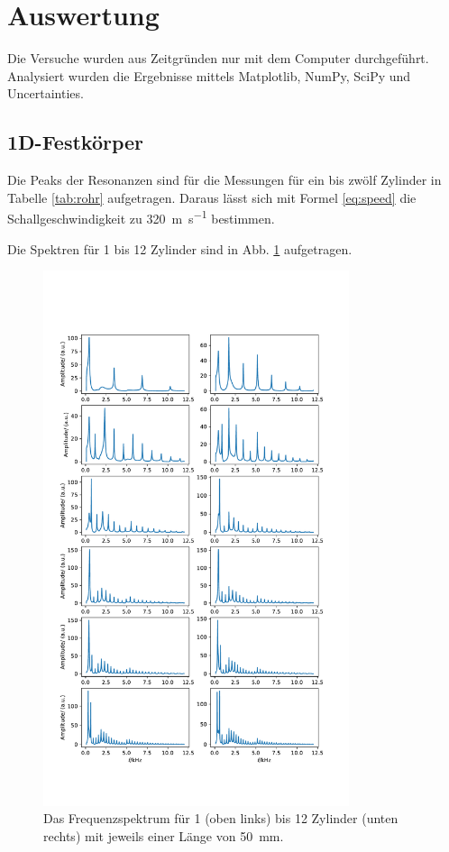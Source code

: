 \section{Auswertung}
\label{sec:Auswertung}

Die Versuche wurden aus Zeitgründen nur mit dem Computer durchgeführt. Analysiert wurden die Ergebnisse mittels Matplotlib, NumPy, SciPy und Uncertainties.

\subsection{1D-Festkörper}

Die Peaks der Resonanzen sind für die Messungen für ein bis zwölf Zylinder in Tabelle \ref{tab:rohr} aufgetragen. 
Daraus lässt sich mit Formel \ref{eq:speed} die Schallgeschwindigkeit zu \SI{320}{\meter\per\second} bestimmen. 

Die Spektren für \num{1} bis \num{12} Zylinder sind in Abb. \ref{fig:spec12} aufgetragen.

\begin{figure}
    \centering
    \includegraphics[width=0.8\textwidth]{plots/A_2.pdf}
    \caption{Das Frequenzspektrum für \num{1} (oben links) bis \num{12} Zylinder (unten rechts) mit jeweils einer Länge von \SI{50}{\milli\metre}.}
    \label{fig:spec12}
\end{figure}

